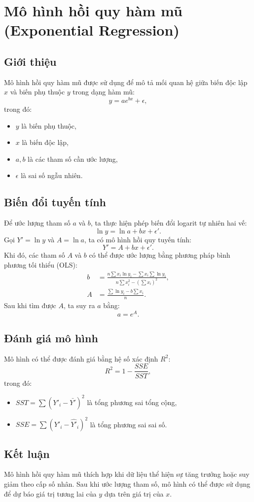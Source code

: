 \chapter{Mô hình hồi quy hàm mũ (Exponential Regression)}
\section{Giới thiệu}
Mô hình hồi quy hàm mũ được sử dụng để mô tả mối quan hệ giữa biến độc lập $x$ và biến phụ thuộc $y$ trong dạng hàm mũ:
\begin{equation}
    y = a e^{b x} + \epsilon,
\end{equation}
trong đó:
\begin{itemize}
    \item $y$ là biến phụ thuộc,
    \item $x$ là biến độc lập,
    \item $a, b$ là các tham số cần ước lượng,
    \item $\epsilon$ là sai số ngẫu nhiên.
\end{itemize}

\section{Biến đổi tuyến tính}
Để ước lượng tham số $a$ và $b$, ta thực hiện phép biến đổi logarit tự nhiên hai vế:
\begin{equation}
    \ln y = \ln a + b x + \epsilon'.
\end{equation}
Gọi $Y' = \ln y$ và $A = \ln a$, ta có mô hình hồi quy tuyến tính:
\begin{equation}
    Y' = A + b x + \epsilon'.
\end{equation}
Khi đó, các tham số $A$ và $b$ có thể được ước lượng bằng phương pháp bình phương tối thiểu (OLS):
\begin{align}
    b &= \frac{n \sum x_i \ln y_i - \sum x_i \sum \ln y_i}{n \sum x_i^2 - (\sum x_i)^2}, \\
    A &= \frac{\sum \ln y_i - b \sum x_i}{n}.
\end{align}
Sau khi tìm được $A$, ta suy ra $a$ bằng:
\begin{equation}
    a = e^A.
\end{equation}

\section{Đánh giá mô hình}
Mô hình có thể được đánh giá bằng hệ số xác định $R^2$:
\begin{equation}
    R^2 = 1 - \frac{SSE}{SST},
\end{equation}
trong đó:
\begin{itemize}
    \item $SST = \sum (Y'_i - \bar{Y'})^2$ là tổng phương sai tổng cộng,
    \item $SSE = \sum (Y'_i - \hat{Y'}_i)^2$ là tổng phương sai sai số.
\end{itemize}

\section{Kết luận}
Mô hình hồi quy hàm mũ thích hợp khi dữ liệu thể hiện sự tăng trưởng hoặc suy giảm theo cấp số nhân. Sau khi ước lượng tham số, mô hình có thể được sử dụng để dự báo giá trị tương lai của $y$ dựa trên giá trị của $x$.
